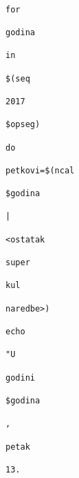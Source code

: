 \documentclass{exam}
\begin{document}
\begin{itemize}
\begin{lstlisting}
                                                                                                                        for
                                                                                                                        godina
                                                                                                                        in
                                                                                                                        $(seq
                                                                                                                        2017
                                                                                                                        $opseg)
                                                                                                                        do
                                                                                                                            petkovi=$(ncal
                                                                                                                            $godina
                                                                                                                            |
                                                                                                                            <ostatak
                                                                                                                            super
                                                                                                                            kul
                                                                                                                            naredbe>)
                                                                                                                                echo
                                                                                                                                "U
                                                                                                                                godini
                                                                                                                                $godina
                                                                                                                                ,
                                                                                                                                petak
                                                                                                                                13.

\end{lstlisting}
\end{itemize}
\end{document}
